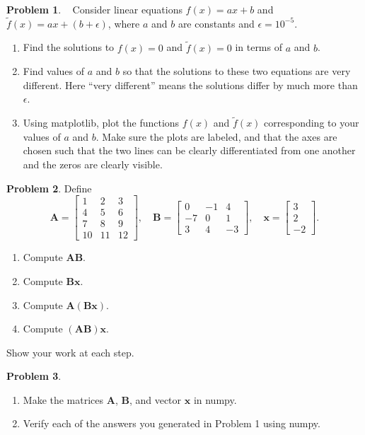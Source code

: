 \documentclass[12pt]{article}
\theoremstyle{definition}
\newtheorem{problem}{Problem}
\renewcommand{\vec}{\mathbf}
\begin{document}
\clearpage

\begin{problem}~
    Consider linear equations $f(x) = a x + b$ and $\tilde{f}(x) = a x + (b+\epsilon)$, where $a$ and $b$ are constants and $\epsilon = 10^{-5}$.
    \begin{enumerate}
        \item Find the solutions to $f(x) = 0$ and $\tilde{f}(x) = 0$ in terms of $a$ and $b$.
        \item Find values of $a$ and $b$ so that the solutions to these two equations are very different. Here ``very different'' means the solutions differ by much more than $\epsilon$.
        \item Using matplotlib, plot the functions $f(x)$ and $\tilde{f}(x)$ corresponding to your values of $a$ and $b$.
            Make sure the plots are labeled, and that the axes are chosen such that the two lines can be clearly differentiated from one another and the zeros are clearly visible.
    \end{enumerate}
\end{problem}


\begin{problem}
Define 
\begin{equation*}
    \vec{A} = \begin{bmatrix} 1 & 2 & 3 \\ 4 & 5 & 6 \\ 7 & 8 & 9 \\ 10 & 11 & 12\end{bmatrix}
    ,\quad
    \vec{B} = \begin{bmatrix} 0 & -1 & 4 \\ -7 & 0 & 1 \\ 3 & 4 & -3\end{bmatrix}
    ,\quad
    \vec{x} = \begin{bmatrix} 3 \\ 2 \\ -2\end{bmatrix}.
\end{equation*}

    \begin{enumerate}
        \item Compute $\vec{A} \vec{B}$.
        \item Compute $\vec{B} \vec{x}$.
        \item Compute $\vec{A} (\vec{B} \vec{x})$.
        \item Compute $(\vec{A}\vec{B}) \vec{x}$.
    \end{enumerate}
Show your work at each step.
\end{problem}

\begin{problem}~
\begin{enumerate}
    \item Make the matrices $\vec{A}$, $\vec{B}$, and vector $\vec{x}$ in numpy.
    \item Verify each of the answers you generated in Problem 1 using numpy. 
\end{enumerate}
\end{problem}
\end{document}
